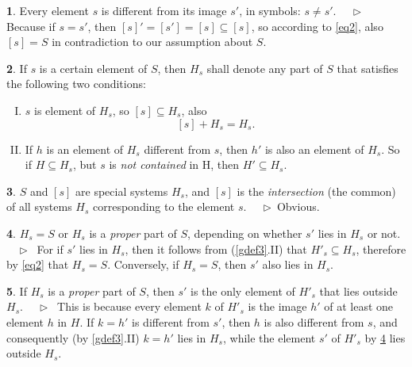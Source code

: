 \documentclass[leqno,hidelinks,10pt]{article}
\theoremstyle{definition}
\newtheorem{satz}{\protect\satzname}
\newtheorem{deff}[satz]{\protect\deffname}
\newcommand{\satzname}{}
\newcommand{\deffname}{}
\renewcommand{\satzname}{\hspace{-4pt}.\ Satz}%
\renewcommand{\deffname}{\hspace{-4pt}.\ Definition}%
\renewcommand{\satzname}{\hspace{-4pt}.\ Theorem}%
\renewcommand{\deffname}{\hspace{-4pt}.\ Definition}%
\newcommand\Beweis{\medskip \newline $ \phantom{'.'} \rhd \ $}%
\newcommand{\partof}{\subseteq}
\newcommand{\sref}[1]{\underline{\ref{#1}}}%
\begin{document}
\begin{paracol}{2}
\begin{rightcolumn}
\begin{satz}\label{thm2}
Every element $s$ is different from its image $s'$, in symbols: $s \neq s'$.
\Beweis
Because if $s = s'$, then $[s]' = [s'] = [s] \partof [s]$, so according to
\eqref{eq2}, also $[s] = S$ in contradiction to our assumption about $S$.
\end{satz}

\newpage

\begin{deff}\label{def3}
If $s$ is a certain element of $S$, then $H_s$ shall denote any part of $S$ that
satisfies the following two conditions:
\vspace{8pt} %

\begin{enumerate}[I.]
\item $s$ is element of $H_s$, so $[s] \partof H_s$, also
\[
	[s] + H_s = H_s.
\]
\item If $h$ is an element of $H_s$ different from $s$, then $h'$ is also an
element of $H_s$. So if $H \partof H_s$, but $s$ is \emph{not contained} in H,
then $H' \partof H_s$.
\end{enumerate}
\end{deff}

\begin{satz}\label{thm4}
$S$ and $[s]$ are special systems $H_s$, and $[s]$ is the \emph{intersection}
(the common) of all systems $H_s$ corresponding to the element $s$.
\Beweis Obvious. \end{satz}

\begin{satz}\label{thm5}
$H_s = S$ or $H_s$ is a \textit{proper} part of $S$, depending on whether
$s'$ lies in $H_s$ or not.
\Beweis
For if $s'$ lies in $H_s$, then it follows from (\sref{gdef3}.II)
that $H'_s \partof H_s$, therefore by \eqref{eq2} that $H_s = S$. Conversely,
if $H_s = S$, then $s'$ also lies in $H_s$.
\end{satz}

\begin{satz}\label{thm6}
If $H_s$ is a \emph{proper} part of $S$, then $s'$ is the only element of
$H'_s$ that lies outside $H_s$.
\Beweis
This is because every element $k$ of $H'_s$ is the image $h'$ of at least one
element $h$ in $H$. If $k=h'$ is different from $s'$, then $h$ is also different
from $s$, and consequently (by \sref{gdef3}.II) $k = h'$ lies in
$H_s$, while the element $s'$ of $H'_s$ by \sref{thm5} lies outside $H_s$.
\end{satz}


\end{rightcolumn}
\end{paracol}
\end{document}
